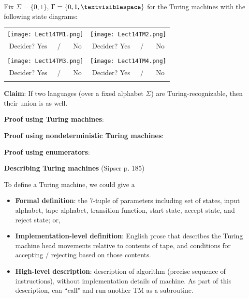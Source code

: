 \documentclass[12pt, oneside]{article}
\begin{document}
Fix $\Sigma = \{0,1\}$, $\Gamma = \{ 0, 1, \textvisiblespace\}$ for the Turing machines with  the following state diagrams:
  
  \begin{center}
  \begin{tabular}{|c|c|}
  \hline
  \hspace{0.8in}\texttt{[image: Lect14TM1.png]} \phantom{\hspace{0.8in}}&\hspace{0.8in} \texttt{[image: Lect14TM2.png]} \phantom{\hspace{0.8in}}\\
  Decider? Yes~~~/ ~~~No
  &Decider? Yes~~~/ ~~~No\\
  & \\
  \hline
  \texttt{[image: Lect14TM3.png]} & \texttt{[image: Lect14TM4.png]} \\
  Decider? Yes~~~/ ~~~No
  &Decider? Yes~~~/ ~~~No\\
  & \\
  
  \hline
  \end{tabular}
  \end{center}
  \newpage



{\bf Claim}: If two languages  (over a fixed alphabet  $\Sigma$) are Turing-recognizable, then  their union  is  as well.

{\bf Proof using Turing machines}:

\vfill

{\bf Proof using nondeterministic Turing machines}: 

\vfill  

{\bf  Proof using enumerators}:

\vfill

\newpage
    
{\bf Describing  Turing machines} (Sipser p. 185)


To define a Turing machine, we could give a 
\begin{itemize}
\item {\bf Formal definition}: the $7$-tuple of parameters including set of states, 
input alphabet, tape alphabet, transition function, start state, accept state, and reject state; or,
\item {\bf Implementation-level definition}: English prose that describes the Turing machine head 
movements relative to contents of tape, and conditions for accepting / rejecting based on those contents.
\item {\bf High-level description}: description of algorithm (precise sequence of instructions), 
without implementation details of machine. As part of this description, can ``call" and run 
another TM as a subroutine.
\end{itemize}
\end{document}
